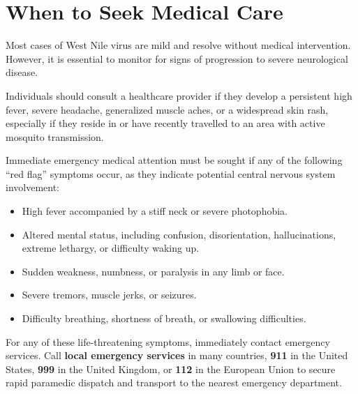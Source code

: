 \section*{When to Seek Medical Care}
Most cases of West Nile virus are mild and resolve without medical intervention. However, it is essential to monitor for signs of progression to severe neurological disease.

Individuals should consult a healthcare provider if they develop a persistent high fever, severe headache, generalized muscle aches, or a widespread skin rash, especially if they reside in or have recently travelled to an area with active mosquito transmission.

Immediate emergency medical attention must be sought if any of the following ``red flag'' symptoms occur, as they indicate potential central nervous system involvement:
\begin{itemize}
    \item High fever accompanied by a stiff neck or severe photophobia.
    \item Altered mental status, including confusion, disorientation, hallucinations, extreme lethargy, or difficulty waking up.
    \item Sudden weakness, numbness, or paralysis in any limb or face.
    \item Severe tremors, muscle jerks, or seizures.
    \item Difficulty breathing, shortness of breath, or swallowing difficulties.
\end{itemize}
For any of these life-threatening symptoms, immediately contact emergency services. Call \textbf{local emergency services} in many countries, \textbf{911} in the United States, \textbf{999} in the United Kingdom, or \textbf{112} in the European Union to secure rapid paramedic dispatch and transport to the nearest emergency department.

